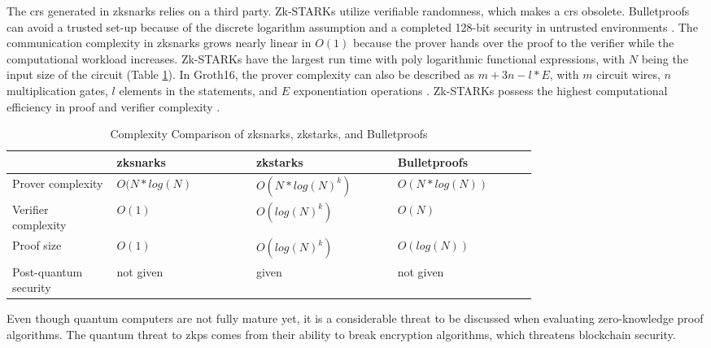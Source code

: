 The \acrshort{crs} generated in \acrshort{zksnark}s relies on a third party. Zk-STARKs utilize verifiable randomness, which makes a \acrshort{crs} obsolete. Bulletproofs can avoid a trusted set-up because of the discrete logarithm assumption and a completed 128-bit security in untrusted environments \citep{Huangetal}. The communication complexity in \acrshort{zksnark}s grows nearly linear in \(O(1)\) because the prover hands over the proof to the verifier while the computational workload increases. Zk-STARKs have the largest run time with poly logarithmic functional expressions, with \(N\) being the input size of the circuit (Table \ref{tab:complexity}). In Groth16, the prover complexity can also be described as \(m + 3n - l*E\), with \(m\) circuit wires, \(n\) multiplication gates, \(l\) elements in the statements, and \(E\) exponentiation operations \citep{Groth2016OnTS}. Zk-STARKs possess the highest computational efficiency in proof and verifier complexity \citep{gongetal}.
\setlength{\tabcolsep}{2ex}
\renewcommand{\arraystretch}{1.5}%
\begin{table}[ht]
	\centering
	    \caption{Complexity Comparison of \acrshort{zksnark}s, \acrshort{zkstark}s, and Bulletproofs}
		\begin{tabular}{| m{0.15\linewidth} | m{0.2\linewidth} |              m{0.2\linewidth}      | m{0.2\linewidth}|} \hline
		\textbf{} & \textbf{\acrshort{zksnark}s} & \textbf{\acrshort{zkstark}s} &\textbf{Bulletproofs}       \\ \hline
            Prover \newline complexity & \(O(N*log(N)\) & \(O(N*log(N)^k)\) & \(O(N*log(N))\) \\  \hline
            Verifier \newline complexity & \(O(1)\) & \(O(log(N)^k)\) & \(O(N)\) \\ \hline 
            Proof size & \(O(1)\) & \(O(log(N)^k)\) &  \(O(log(N))\)\\  \hline
            Post-quantum security &  not given & given & not given\\  \hline 
	\end{tabular}
\label{tab:complexity}
\end{table}

Even though quantum computers are not fully mature yet, it is a considerable threat to be discussed when evaluating zero-knowledge proof algorithms. The quantum threat to \acrshort{zkp}s comes from their ability to break encryption algorithms, which threatens blockchain security.

